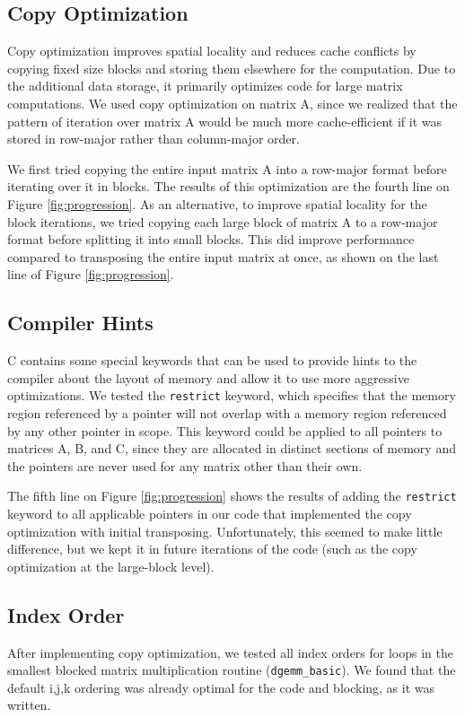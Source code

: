 \documentclass[letterpaper]{article}	 %
\begin{document}
\subsection{Copy Optimization}
Copy optimization improves spatial locality and reduces cache conflicts by copying fixed size blocks and storing them elsewhere for the computation. Due to the additional data storage, it primarily optimizes code for large matrix computations. We used copy optimization on matrix A, since we realized that the pattern of iteration over matrix A would be much more cache-efficient if it was stored in row-major rather than column-major order.

We first tried copying the entire input matrix A into a row-major format before iterating over it in blocks. The results of this optimization are the fourth line on Figure \ref{fig:progression}. As an alternative, to improve spatial locality for the block iterations, we tried copying each large block of matrix A to a row-major format before splitting it into small blocks. This did improve performance compared to transposing the entire input matrix at once, as shown on the last line of Figure \ref{fig:progression}.

\subsection{Compiler Hints}
C contains some special keywords that can be used to provide hints to the compiler about the layout of memory and allow it to use more aggressive optimizations. We tested the \texttt{restrict} keyword, which specifies that the memory region referenced by a pointer will not overlap with a memory region referenced by any other pointer in scope. This keyword could be applied to all pointers to matrices A, B, and C, since they are allocated in distinct sections of memory and the pointers are never used for any matrix other than their own.

The fifth line on Figure \ref{fig:progression} shows the results of adding the \texttt{restrict} keyword to all applicable pointers in our code that implemented the copy optimization with initial transposing. Unfortunately, this seemed to make little difference, but we kept it in future iterations of the code (such as the copy optimization at the large-block level).

\subsection{Index Order}
After implementing copy optimization, we tested all index orders for loops in the smallest blocked matrix multiplication routine (\texttt{dgemm\_basic}). We found that the default i,j,k ordering was already optimal for the code and blocking, as it was written.
\end{document}
